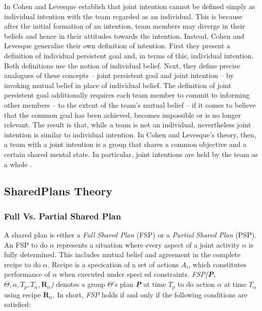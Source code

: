 \documentclass[11pt]{article}
\begin{document}
In \cite{cohen:teamwork} Cohen and Levesque establish that joint intention
cannot be defined simply as individual intention with the team regarded as an
individual. This is because after the initial formation of an intention, team
members may diverge in their beliefs and hence in their attitudes towards the
intention. Instead, Cohen and Levesque generalise their own definition of
intention. First they present a definition of individual persistent goal and, in
terms of this, individual intention. Both definitions use the notion of
individual belief. Next, they define precise analogues of these concepts --
joint persistent goal and joint intention -- by invoking mutual belief in place
of individual belief. The definition of joint persistent goal additionally
requires each team member to commit to informing other members -- to the extent
of the team's mutual belief -- if it comes to believe that the common goal has
been achieved, becomes impossible or is no longer relevant. The result is that,
while a team is not an individual, nevertheless joint intention is similar to
individual intention. In Cohen and Levesque's theory, then, a team with a joint
intention is a group that shares a common objective and a certain shared mental
state. In particular, joint intentions are held by the team as a whole
\cite{jarvis:teams-multiagent-systems}.

\subsection{SharedPlans Theory}
\label{sec:sharedplans}

\subsubsection{Full Vs. Partial Shared Plan}
A shared plan is either a \textit{Full Shared Plan} (FSP) or a \textit{Partial
Shared Plan} (PSP). An FSP to do $\alpha$ represents a situation where every
aspect of a joint activity $\alpha$ is fully determined. This includes mutual
belief and agreement in the complete recipe to do $\alpha$. Recipe is a
specication of a set of actions \textit{$A_i$}, which constitutes performance of
$\alpha$ when executed under speci ed constraints. \textit{FSP(\textbf{P},
$\Theta, \alpha, T_p, T_\alpha, \textbf{R}_\alpha$)} denotes a group $\Theta$'s
plan \textit{\textbf{P}} at time \textit{$T_p$} to do action $\alpha$ at time
\textit{$T_\alpha$} using recipe \textit{$\textbf{R}_\alpha$}. In short,
\textit{FSP} holds if and only if the following conditions are satisfied:
\end{document}
